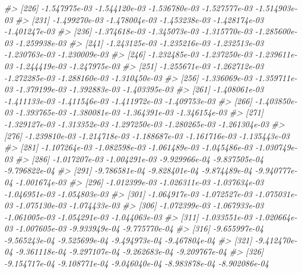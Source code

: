 \documentclass[
]{article}
\newenvironment{Shaded}{\begin{snugshade}}{\end{snugshade}}
\newcommand{\CommentTok}[1]{\textcolor[rgb]{0.56,0.35,0.01}{\textit{#1}}}
\begin{document}
\begin{Shaded}
\begin{Highlighting}[]
\CommentTok{\#\textgreater{} [226] {-}1.547975e{-}03 {-}1.544120e{-}03 {-}1.536780e{-}03 {-}1.527577e{-}03 {-}1.514903e{-}03}
\CommentTok{\#\textgreater{} [231] {-}1.499270e{-}03 {-}1.478004e{-}03 {-}1.453238e{-}03 {-}1.428174e{-}03 {-}1.401247e{-}03}
\CommentTok{\#\textgreater{} [236] {-}1.374618e{-}03 {-}1.345073e{-}03 {-}1.315770e{-}03 {-}1.285600e{-}03 {-}1.259938e{-}03}
\CommentTok{\#\textgreater{} [241] {-}1.243125e{-}03 {-}1.235216e{-}03 {-}1.232513e{-}03 {-}1.230763e{-}03 {-}1.230009e{-}03}
\CommentTok{\#\textgreater{} [246] {-}1.232485e{-}03 {-}1.237250e{-}03 {-}1.239611e{-}03 {-}1.244419e{-}03 {-}1.247975e{-}03}
\CommentTok{\#\textgreater{} [251] {-}1.255671e{-}03 {-}1.262712e{-}03 {-}1.272285e{-}03 {-}1.288160e{-}03 {-}1.310450e{-}03}
\CommentTok{\#\textgreater{} [256] {-}1.336069e{-}03 {-}1.359711e{-}03 {-}1.379199e{-}03 {-}1.392883e{-}03 {-}1.403395e{-}03}
\CommentTok{\#\textgreater{} [261] {-}1.408061e{-}03 {-}1.411133e{-}03 {-}1.411546e{-}03 {-}1.411972e{-}03 {-}1.409753e{-}03}
\CommentTok{\#\textgreater{} [266] {-}1.403850e{-}03 {-}1.393765e{-}03 {-}1.380081e{-}03 {-}1.364391e{-}03 {-}1.346154e{-}03}
\CommentTok{\#\textgreater{} [271] {-}1.329127e{-}03 {-}1.313352e{-}03 {-}1.297250e{-}03 {-}1.280265e{-}03 {-}1.261304e{-}03}
\CommentTok{\#\textgreater{} [276] {-}1.239810e{-}03 {-}1.214718e{-}03 {-}1.188687e{-}03 {-}1.161716e{-}03 {-}1.135443e{-}03}
\CommentTok{\#\textgreater{} [281] {-}1.107264e{-}03 {-}1.082598e{-}03 {-}1.061489e{-}03 {-}1.045486e{-}03 {-}1.030749e{-}03}
\CommentTok{\#\textgreater{} [286] {-}1.017207e{-}03 {-}1.004291e{-}03 {-}9.929966e{-}04 {-}9.837505e{-}04 {-}9.796822e{-}04}
\CommentTok{\#\textgreater{} [291] {-}9.786581e{-}04 {-}9.828401e{-}04 {-}9.874489e{-}04 {-}9.940777e{-}04 {-}1.001674e{-}03}
\CommentTok{\#\textgreater{} [296] {-}1.012399e{-}03 {-}1.026311e{-}03 {-}1.037634e{-}03 {-}1.046951e{-}03 {-}1.054803e{-}03}
\CommentTok{\#\textgreater{} [301] {-}1.064917e{-}03 {-}1.072527e{-}03 {-}1.075031e{-}03 {-}1.075130e{-}03 {-}1.074433e{-}03}
\CommentTok{\#\textgreater{} [306] {-}1.072399e{-}03 {-}1.067933e{-}03 {-}1.061005e{-}03 {-}1.054291e{-}03 {-}1.044063e{-}03}
\CommentTok{\#\textgreater{} [311] {-}1.033551e{-}03 {-}1.020664e{-}03 {-}1.007605e{-}03 {-}9.933949e{-}04 {-}9.775770e{-}04}
\CommentTok{\#\textgreater{} [316] {-}9.655997e{-}04 {-}9.565243e{-}04 {-}9.525699e{-}04 {-}9.494973e{-}04 {-}9.467804e{-}04}
\CommentTok{\#\textgreater{} [321] {-}9.412470e{-}04 {-}9.361118e{-}04 {-}9.297107e{-}04 {-}9.262683e{-}04 {-}9.209767e{-}04}
\CommentTok{\#\textgreater{} [326] {-}9.154717e{-}04 {-}9.108771e{-}04 {-}9.046040e{-}04 {-}8.983878e{-}04 {-}8.902086e{-}04}

\end{Highlighting}
\end{Shaded}
\end{document}
